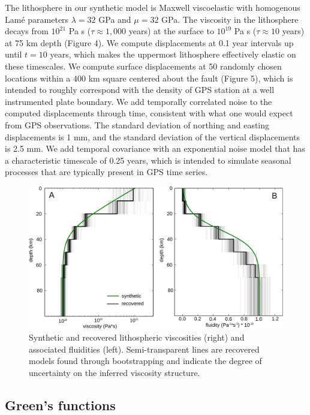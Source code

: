 \documentclass[extra,mreferee]{gji}
\begin{document}
The lithosphere in our synthetic model is Maxwell viscoelastic with
homogenous Lam\'e parameters $\lambda = 32$ GPa and $\mu = 32$
GPa.  The viscosity in the lithosphere decays from $10^{21}$ Pa s
($\tau\approx1,000$ years) at the surface to $10^{19}$ Pa s
($\tau\approx10$ years) at 75 km depth (Figure 4).  We compute
displacements at 0.1 year intervals up until $t=10$ years, which makes
the uppermost lithosphere effectively elastic on these timescales. We compute
surface displacements at 50 randomly chosen locations within a 400 km
square centered about the fault (Figure 5), which is intended to
roughly correspond with the density of GPS station at a well
instrumented plate boundary.  We add temporally correlated noise to
the computed displacements through time, consistent with what one would
expect from GPS observations.  The standard deviation of northing and
easting displacements is 1 mm, and the standard deviation of the
vertical displacements is 2.5 mm.  We add temporal covariance with an
exponential noise model that has a characteristic timescale of 0.25
years, which is intended to simulate seasonal processes that are
typically present in GPS time series.

\begin{figure}\label{figure4}
  \centering
  \includegraphics[scale=0.7]{FinalFigures/Figure3.pdf}
  \caption{Synthetic and recovered lithospheric viscosities (right)
    and associated fluidities (left).  Semi-transparent lines are recovered
    models found through bootstrapping and indicate the degree of
    uncertainty on the inferred viscosity structure.}
  \label{Figure 4}
\end{figure}

\subsection{Green's functions}
\end{document}
